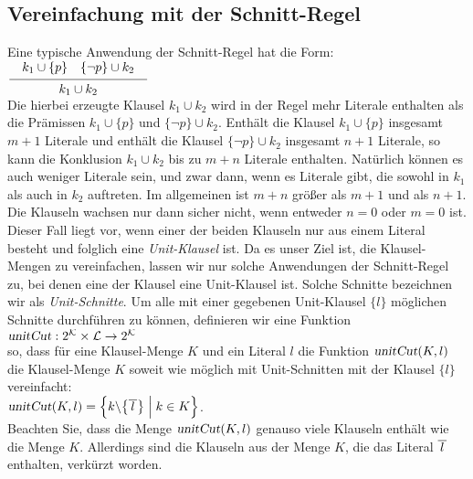 \subsection{Vereinfachung mit der Schnitt-Regel}
Eine typische Anwendung der Schnitt-Regel hat die Form: \\[0.2cm]
\hspace*{1.3cm} $\schluss{ k_1 \cup \{p\} \quad \{\neg p\} \cup k_2}{k_1 \cup k_2}$
\\[0.2cm]
Die hierbei erzeugte Klausel $k_1 \cup k_2$ wird in der Regel mehr Literale enthalten
als die Pr\"{a}missen $k_1 \cup \{p\}$ und $\bigl\{\neg p\} \cup k_2$.  Enth\"{a}lt die
Klausel $k_1 \cup \{p\}$ insgesamt $m+1$ Literale und enth\"{a}lt die Klausel
$\bigl\{\neg p\} \cup k_2$ insgesamt $n+1$ Literale, so kann die Konklusion $k_1 \cup k_2$ 
bis zu $m + n$ Literale enthalten.  Nat\"{u}rlich k\"{o}nnen es auch weniger Literale 
sein, und zwar dann, wenn es Literale gibt, die sowohl in $k_1$ als auch in $k_2$
auftreten.  Im allgemeinen ist $m + n$ gr\"{o}\ss{}er als $m + 1$ und als $n + 1$.  Die
Klauseln wachsen nur dann sicher nicht, wenn entweder $n = 0$ oder $m = 0$ ist.
Dieser Fall liegt vor, wenn einer der beiden Klauseln nur aus einem Literal besteht
und folglich eine \emph{\color{blue}Unit-Klausel} ist.  Da es unser Ziel ist, die Klausel-Mengen
zu vereinfachen, lassen wir nur solche Anwendungen der Schnitt-Regel zu, bei denen
eine der Klausel eine Unit-Klausel ist.  Solche Schnitte bezeichnen wir als
\emph{\color{blue}Unit-Schnitte}.  Um alle mit einer gegebenen Unit-Klausel $\{l\}$ m\"{o}glichen Schnitte
durchf\"{u}hren zu k\"{o}nnen, definieren wir eine Funktion
\\[0.2cm]
\hspace*{1.3cm}
$\textsl{unitCut}: 2^\mathcal{K} \times \mathcal{L} \rightarrow 2^\mathcal{K}$
\\[0.2cm]
so, dass f\"{u}r eine Klausel-Menge $K$ und ein Literal $l$ die Funktion
$\textsl{unitCut}(K,l)$ die Klausel-Menge $K$ soweit wie m\"{o}glich mit Unit-Schnitten mit der Klausel
$\{l\}$ vereinfacht:
\\[0.2cm]
\hspace*{1.3cm}
$\textsl{unitCut}(K,l) = \Bigl\{ k \backslash \bigl\{ \overline{\,l\,} \bigr\} \;\Big|\; k \in K \Bigr\}$.
\\[0.2cm]
Beachten Sie, dass die Menge $\textsl{unitCut}(K,l)$ genauso viele Klauseln enth\"{a}lt wie die Menge
$K$.  Allerdings sind die Klauseln aus der Menge $K$, die das Literal $\overline{\,l\,}$
enthalten, verk\"{u}rzt worden. 

